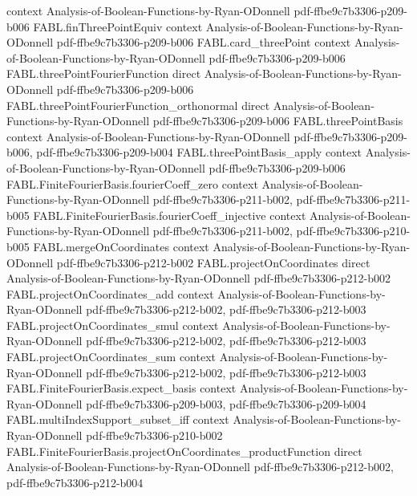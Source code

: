 \begin{theorem}
  {context}
  {Analysis-of-Boolean-Functions-by-Ryan-ODonnell}
  {pdf-ffbe9c7b3306-p209-b006}
\proofstep
  {FABL.finThreePointEquiv}
  {context}
  {Analysis-of-Boolean-Functions-by-Ryan-ODonnell}
  {pdf-ffbe9c7b3306-p209-b006}
\proofstep
  {FABL.card_threePoint}
  {context}
  {Analysis-of-Boolean-Functions-by-Ryan-ODonnell}
  {pdf-ffbe9c7b3306-p209-b006}
\proofstep
  {FABL.threePointFourierFunction}
  {direct}
  {Analysis-of-Boolean-Functions-by-Ryan-ODonnell}
  {pdf-ffbe9c7b3306-p209-b006}
\proofstep
  {FABL.threePointFourierFunction_orthonormal}
  {direct}
  {Analysis-of-Boolean-Functions-by-Ryan-ODonnell}
  {pdf-ffbe9c7b3306-p209-b006}
\proofstep
  {FABL.threePointBasis}
  {context}
  {Analysis-of-Boolean-Functions-by-Ryan-ODonnell}
  {pdf-ffbe9c7b3306-p209-b006,
    pdf-ffbe9c7b3306-p209-b004}
\proofstep
  {FABL.threePointBasis_apply}
  {context}
  {Analysis-of-Boolean-Functions-by-Ryan-ODonnell}
  {pdf-ffbe9c7b3306-p209-b006}
\proofstep
  {FABL.FiniteFourierBasis.fourierCoeff_zero}
  {context}
  {Analysis-of-Boolean-Functions-by-Ryan-ODonnell}
  {pdf-ffbe9c7b3306-p211-b002,
    pdf-ffbe9c7b3306-p211-b005}
\proofstep
  {FABL.FiniteFourierBasis.fourierCoeff_injective}
  {context}
  {Analysis-of-Boolean-Functions-by-Ryan-ODonnell}
  {pdf-ffbe9c7b3306-p211-b002,
    pdf-ffbe9c7b3306-p210-b005}
\proofstep
  {FABL.mergeOnCoordinates}
  {context}
  {Analysis-of-Boolean-Functions-by-Ryan-ODonnell}
  {pdf-ffbe9c7b3306-p212-b002}
\proofstep
  {FABL.projectOnCoordinates}
  {direct}
  {Analysis-of-Boolean-Functions-by-Ryan-ODonnell}
  {pdf-ffbe9c7b3306-p212-b002}
\proofstep
  {FABL.projectOnCoordinates_add}
  {context}
  {Analysis-of-Boolean-Functions-by-Ryan-ODonnell}
  {pdf-ffbe9c7b3306-p212-b002,
    pdf-ffbe9c7b3306-p212-b003}
\proofstep
  {FABL.projectOnCoordinates_smul}
  {context}
  {Analysis-of-Boolean-Functions-by-Ryan-ODonnell}
  {pdf-ffbe9c7b3306-p212-b002,
    pdf-ffbe9c7b3306-p212-b003}
\proofstep
  {FABL.projectOnCoordinates_sum}
  {context}
  {Analysis-of-Boolean-Functions-by-Ryan-ODonnell}
  {pdf-ffbe9c7b3306-p212-b002,
    pdf-ffbe9c7b3306-p212-b003}
\proofstep
  {FABL.FiniteFourierBasis.expect_basis}
  {context}
  {Analysis-of-Boolean-Functions-by-Ryan-ODonnell}
  {pdf-ffbe9c7b3306-p209-b003,
    pdf-ffbe9c7b3306-p209-b004}
\proofstep
  {FABL.multiIndexSupport_subset_iff}
  {context}
  {Analysis-of-Boolean-Functions-by-Ryan-ODonnell}
  {pdf-ffbe9c7b3306-p210-b002}
\proofstep
  {FABL.FiniteFourierBasis.projectOnCoordinates_productFunction}
  {direct}
  {Analysis-of-Boolean-Functions-by-Ryan-ODonnell}
  {pdf-ffbe9c7b3306-p212-b002,
    pdf-ffbe9c7b3306-p212-b004}

\end{theorem}
